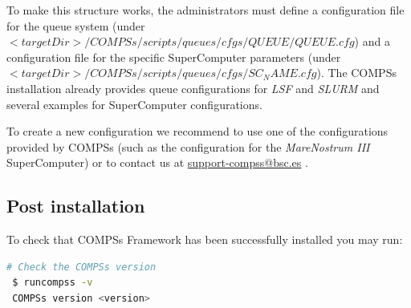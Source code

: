 To make this structure works, the administrators must define a configuration file for the queue system 
(under $<targetDir>/COMPSs/scripts/queues/cfgs/QUEUE/QUEUE.cfg$) and a configuration file for the specific SuperComputer parameters
(under $<targetDir>/COMPSs/scripts/queues/cfgs/SC_NAME.cfg$). The COMPSs installation already provides queue configurations for \textit{LSF} and 
\textit{SLURM} and several examples for SuperComputer configurations. 

To create a new configuration we recommend to use one of the configurations provided by COMPSs (such as the configuration for the
\textit{MareNostrum III} SuperComputer) or to contact us at \url{support-compss@bsc.es} .

\subsection{Post installation}
To check that COMPSs Framework has been successfully installed you may run:
\begin{lstlisting}[language=bash]
 # Check the COMPSs version
 $ runcompss -v
 COMPSs version <version>
\end{lstlisting}

